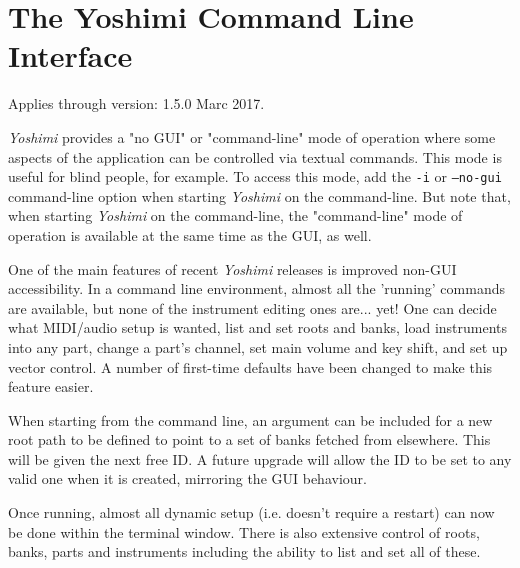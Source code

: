 %
%
%

\section{The Yoshimi Command Line Interface}
\label{sec:command_line}

   Applies through version: 1.5.0 Marc 2017.

   \textsl{Yoshimi} provides a "no GUI" or "command-line" mode of operation
   where some aspects of the application can be controlled via textual commands.
   This mode is useful for blind people, for example.  To access this mode, add
   the \texttt{-i} or \texttt{--no-gui} command-line option when starting
   \textsl{Yoshimi} on the command-line.  But note that, when starting
   \textsl{Yoshimi} on the command-line, the "command-line" mode of operation is
   available at the same time as the GUI, as well.

   One of the main features of recent \textsl{Yoshimi} releases
   is improved non-GUI
   accessibility.  In a command line environment, almost all the 'running'
   commands are available, but none of the instrument editing ones are... yet!
   One can decide what MIDI/audio setup is wanted, list and set roots and banks,
   load instruments into any part, change a part's channel, set main volume and
   key shift, and set up vector control.  A number of first-time defaults have
   been changed to make this feature easier.

   When starting from the command line, an argument can be included for a new
   root path to be defined to point to a set of banks fetched from elsewhere.
   This will be given the next free ID. A future upgrade will allow the ID to
   be set to any valid one when it is created, mirroring the GUI behaviour.

   Once running, almost all dynamic setup (i.e. doesn't require a restart) can
   now be done within the terminal window. There is also extensive control of
   roots, banks, parts and instruments including the ability to list and set
   all of these.

